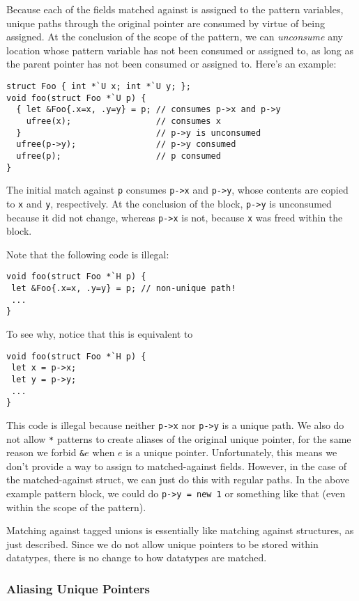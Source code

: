 Because each of the fields matched against is assigned to the pattern
variables, unique paths through the original pointer are consumed by virtue
of being assigned.  At the conclusion of the scope of the pattern, we can
\emph{unconsume} any location whose pattern variable has not been consumed
or assigned to, as long as the parent pointer has not been consumed or
assigned to.  Here's an example:
\begin{verbatim}
struct Foo { int *`U x; int *`U y; };
void foo(struct Foo *`U p) {
  { let &Foo{.x=x, .y=y} = p; // consumes p->x and p->y
    ufree(x);                 // consumes x
  }                           // p->y is unconsumed
  ufree(p->y);                // p->y consumed
  ufree(p);                   // p consumed
}
\end{verbatim}
The initial match against \texttt{p} consumes \texttt{p->x} and
\texttt{p->y}, whose contents are copied to \texttt{x} and \texttt{y},
respectively.  At the conclusion of the block, \texttt{p->y} is unconsumed
because it did not change, whereas \texttt{p->x} is not, because \texttt{x}
was freed within the block.

Note that the following code is illegal:
\begin{verbatim}
void foo(struct Foo *`H p) {
 let &Foo{.x=x, .y=y} = p; // non-unique path!
 ...
}
\end{verbatim}
To see why, notice that this is equivalent to
\begin{verbatim}
void foo(struct Foo *`H p) {
 let x = p->x;
 let y = p->y;
 ...
}
\end{verbatim}
This code is illegal because neither \texttt{p->x} nor \texttt{p->y} is a
unique path.  We also do not allow \texttt{*} patterns to create aliases of
the original unique pointer, for the same reason we forbid \texttt{\&}$e$
when $e$ is a unique pointer.  Unfortunately, this means we don't provide a
way to assign to matched-against fields.  However, in the case of the
matched-against struct, we can just do this with regular paths.  In the
above example pattern block, we could do \texttt{p->y = new 1} or something
like that (even within the scope of the pattern).

Matching against tagged unions is essentially like matching against
structures, as just described.  Since we do not allow unique pointers to be
stored within datatypes, there is no change to how datatypes are matched.

\subsubsection{Aliasing Unique Pointers}
\label{sec:alias-pats}

